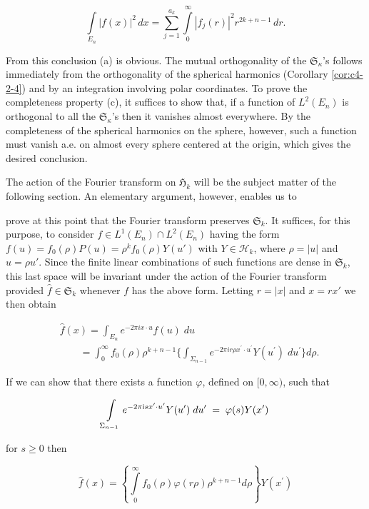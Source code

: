 \[
\int\limits_{E_{n}}|f(x)|^{2}\,dx=\sum_{j=1}^{a_{k}}\int\limits_{0}^{\infty}|f_{j}(r)|^{2}r^{2k+n-1}\,dr.
\]

From this conclusion (a) is obvious. The mutual orthogonality of the $\mathfrak{S}_{\kappa}$'s follows immediately from the orthogonality of the spherical harmonics (Corollary \ref{cor:c4-2-4}) and by an integration involving polar coordinates. To prove the completeness property (c), it suffices to show that, if a function of $L^{2}(E_{n})$ is orthogonal to all the $\mathfrak{S}_{\kappa}$'s then it vanishes almost everywhere. By the completeness of the spherical harmonics on the sphere, however, such a function must vanish a.e. on almost every sphere centered at the origin, which gives the desired conclusion.

The action of the Fourier transform on $\mathfrak{H}_{k}$ will be the subject matter of the following section. An elementary argument, however, enables us to

prove at this point that the Fourier transform preserves $\mathfrak{S}_k$. It suffices, for this purpose, to consider $f\in L^1(E_n)\cap L^2(E_n)$ having the form $f(u)=f_0(\rho)P(u)=\rho^k f_0(\rho)Y(u')$ with $Y\in\mathcal{H}_k$, where $\rho=|u|$ and $u=\rho u'$. Since the finite linear combinations of such functions are dense in $\mathfrak{S}_k$, this last space will be invariant under the action of the Fourier transform provided $\hat{f}\in\mathfrak{S}_k$ whenever $f$ has the above form. Letting $r=|x|$ and $x=rx'$ we then obtain

\[
\begin{aligned}&\hat{f}(x)=\int_{E_{n}}e^{-2\pi i x\cdot u}f(u)\;d u\\&\qquad=\int_{0}^{\infty}f_{0}(\rho)\rho^{k+n-1}\Biggl\{\int_{\Sigma_{n-1}}e^{-2\pi i r\rho x^{\prime}\cdot u^{\prime}}Y(u^{\prime})\;d u^{\prime}\Biggr\}d\rho.\end{aligned}
\]

If we can show that there exists a function $\varphi$, defined on $[0, \infty)$, such that

\begin{equation}\label{eq:c4-2-19}
\intop_{\Sigma_{n-1}}e^{-2\pi\mathrm{i}s x^{\prime}\cdot u^{\prime}}Y(u^{\prime})\;d u^{\prime}\;=\;\varphi(s)Y(x^{\prime})
\end{equation}

for $s \geq 0$ then

\[
\hat{f}(x)=\left\{\int\limits_{0}^{\infty}f_{0}(\rho)\varphi(r\rho)\rho^{k+n-1}d\rho\right\}Y(x^{\prime})
\]

